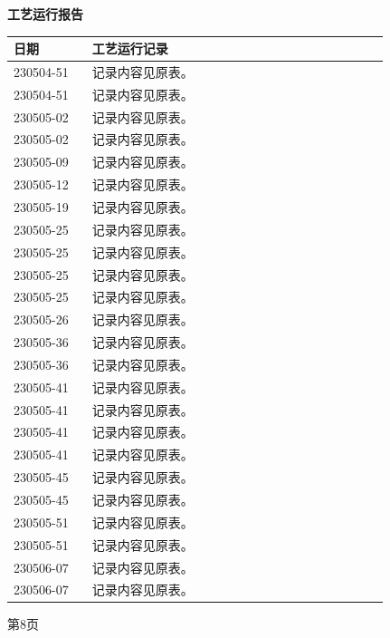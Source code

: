 \documentclass[UTF8,10pt,a4paper,fontset=fandol]{ctexart}
\begin{document}
\newpage

\begin{center}
\textbf{工艺运行报告}

\vspace{0.5em}
\small
\begin{tabular}{|p{0.18\linewidth}|p{0.68\linewidth}|}
\hline
\textbf{日期} & \textbf{工艺运行记录} \\
\hline
230504-51 & 记录内容见原表。 \\
\hline
230504-51 & 记录内容见原表。 \\
\hline
230505-02 & 记录内容见原表。 \\
\hline
230505-02 & 记录内容见原表。 \\
\hline
230505-09 & 记录内容见原表。 \\
\hline
230505-12 & 记录内容见原表。 \\
\hline
230505-19 & 记录内容见原表。 \\
\hline
230505-25 & 记录内容见原表。 \\
\hline
230505-25 & 记录内容见原表。 \\
\hline
230505-25 & 记录内容见原表。 \\
\hline
230505-25 & 记录内容见原表。 \\
\hline
230505-26 & 记录内容见原表。 \\
\hline
230505-36 & 记录内容见原表。 \\
\hline
230505-36 & 记录内容见原表。 \\
\hline
230505-41 & 记录内容见原表。 \\
\hline
230505-41 & 记录内容见原表。 \\
\hline
230505-41 & 记录内容见原表。 \\
\hline
230505-41 & 记录内容见原表。 \\
\hline
230505-45 & 记录内容见原表。 \\
\hline
230505-45 & 记录内容见原表。 \\
\hline
230505-51 & 记录内容见原表。 \\
\hline
230505-51 & 记录内容见原表。 \\
\hline
230506-07 & 记录内容见原表。 \\
\hline
230506-07 & 记录内容见原表。 \\
\hline
\end{tabular}

\vspace{0.5em}

第8页
\end{center}
\end{document}
